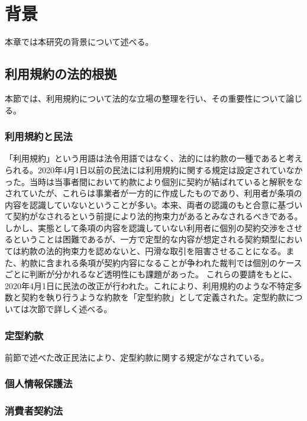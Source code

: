 \chapter{背景}
\label{background}
本章では本研究の背景について述べる。

\section{利用規約の法的根拠}
本節では、利用規約について法的な立場の整理を行い、その重要性について論じる。

\subsection{利用規約と民法}
「利用規約」という用語は法令用語ではなく、法的には約款の一種であると考えられる\cite{itakura2013}。2020年4月1日以前の民法には利用規約に関する規定は設定されていなかった。当時は当事者間において約款により個別に契約が結ばれていると解釈をなされていたが、これらは事業者が一方的に作成したものであり、利用者が条項の内容を認識していないということが多い。本来、両者の認識のもと合意に基づいて契約がなされるという前提により法的拘束力があるとみなされるべきである。しかし、実態として条項の内容を認識していない利用者に個別の契約交渉をさせるということは困難であるが、一方で定型的な内容が想定される契約類型においては約款の法的拘束力を認めないと、円滑な取引を阻害させることになる。また、約款に含まれる条項が契約内容になることが争われた裁判では個別のケースごとに判断が分かれるなど透明性にも課題があった\cite{hashimoto2021}。
これらの要請をもとに、2020年4月1日に民法の改正が行われた\cite{moj2020minpo}。これにより、利用規約のような不特定多数と契約を執り行うような約款を「定型約款」として定義された。定型約款については次節で詳しく述べる。

\subsection{定型約款}
前節で述べた改正民法により、定型約款に関する規定がなされている。

\subsection{個人情報保護法}


\subsection{消費者契約法}


